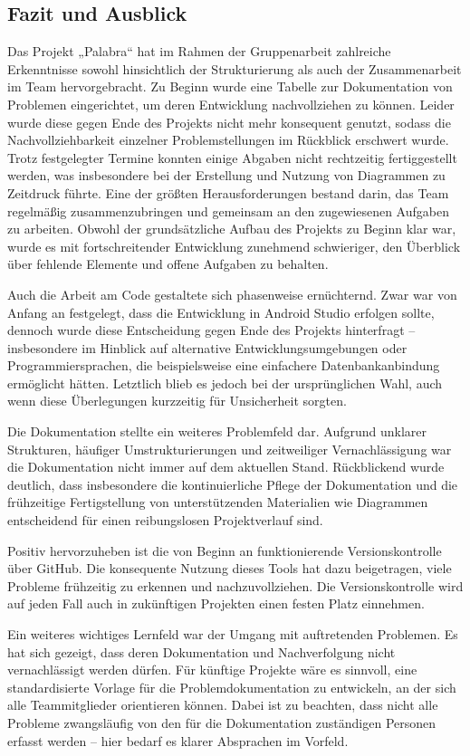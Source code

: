 \documentclass[12pt,a4paper]{article}
\begin{document}
\subsection{Fazit und Ausblick}
Das Projekt „Palabra“ hat im Rahmen der Gruppenarbeit zahlreiche Erkenntnisse sowohl hinsichtlich der Strukturierung als auch der Zusammenarbeit im Team hervorgebracht. Zu Beginn wurde eine Tabelle zur Dokumentation von Problemen eingerichtet, um deren Entwicklung nachvollziehen zu können. Leider wurde diese gegen Ende des Projekts nicht mehr konsequent genutzt, sodass die Nachvollziehbarkeit einzelner Problemstellungen im Rückblick erschwert wurde. Trotz festgelegter Termine konnten einige Abgaben nicht rechtzeitig fertiggestellt werden, was insbesondere bei der Erstellung und Nutzung von Diagrammen zu Zeitdruck führte. Eine der größten Herausforderungen bestand darin, das Team regelmäßig zusammenzubringen und gemeinsam an den zugewiesenen Aufgaben zu arbeiten. Obwohl der grundsätzliche Aufbau des Projekts zu Beginn klar war, wurde es mit fortschreitender Entwicklung zunehmend schwieriger, den Überblick über fehlende Elemente und offene Aufgaben zu behalten.

Auch die Arbeit am Code gestaltete sich phasenweise ernüchternd. Zwar war von Anfang an festgelegt, dass die Entwicklung in Android Studio erfolgen sollte, dennoch wurde diese Entscheidung gegen Ende des Projekts hinterfragt – insbesondere im Hinblick auf alternative Entwicklungsumgebungen oder Programmiersprachen, die beispielsweise eine einfachere Datenbankanbindung ermöglicht hätten. Letztlich blieb es jedoch bei der ursprünglichen Wahl, auch wenn diese Überlegungen kurzzeitig für Unsicherheit sorgten.

Die Dokumentation stellte ein weiteres Problemfeld dar. Aufgrund unklarer Strukturen, häufiger Umstrukturierungen und zeitweiliger Vernachlässigung war die Dokumentation nicht immer auf dem aktuellen Stand. Rückblickend wurde deutlich, dass insbesondere die kontinuierliche Pflege der Dokumentation und die frühzeitige Fertigstellung von unterstützenden Materialien wie Diagrammen entscheidend für einen reibungslosen Projektverlauf sind.

Positiv hervorzuheben ist die von Beginn an funktionierende Versionskontrolle über GitHub. Die konsequente Nutzung dieses Tools hat dazu beigetragen, viele Probleme frühzeitig zu erkennen und nachzuvollziehen. Die Versionskontrolle wird auf jeden Fall auch in zukünftigen Projekten einen festen Platz einnehmen.

Ein weiteres wichtiges Lernfeld war der Umgang mit auftretenden Problemen. Es hat sich gezeigt, dass deren Dokumentation und Nachverfolgung nicht vernachlässigt werden dürfen. Für künftige Projekte wäre es sinnvoll, eine standardisierte Vorlage für die Problemdokumentation zu entwickeln, an der sich alle Teammitglieder orientieren können. Dabei ist zu beachten, dass nicht alle Probleme zwangsläufig von den für die Dokumentation zuständigen Personen erfasst werden – hier bedarf es klarer Absprachen im Vorfeld.
\end{document}
